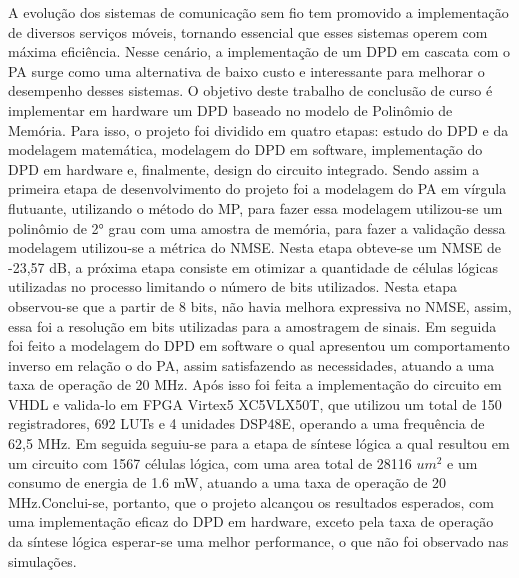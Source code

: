 A evolução dos sistemas de comunicação sem fio tem promovido a implementação de diversos serviços móveis, tornando essencial que esses sistemas operem com máxima eficiência. Nesse cenário, a implementação de um DPD em cascata com o PA surge como uma alternativa de baixo custo e interessante para melhorar o desempenho desses sistemas.
O objetivo deste trabalho de conclusão de curso é implementar em hardware um DPD baseado no modelo de Polinômio de Memória. Para isso, o projeto foi dividido em quatro etapas: estudo do DPD e da modelagem matemática, modelagem do DPD em software, implementação do DPD em hardware e, finalmente, design do circuito integrado.
Sendo assim a primeira etapa de desenvolvimento do projeto foi a modelagem do PA em vírgula flutuante, utilizando o método do MP, para fazer essa modelagem utilizou-se um polinômio de 2° grau com uma amostra de memória, para fazer a validação dessa modelagem utilizou-se a métrica do NMSE. Nesta etapa obteve-se um NMSE de -23,57 dB, a próxima etapa consiste em otimizar a quantidade de células lógicas utilizadas no processo limitando o número de bits utilizados. Nesta etapa observou-se que a partir de 8 bits, não havia melhora expressiva no NMSE, assim, essa foi a resolução em bits utilizadas para a amostragem de sinais. Em seguida foi feito a modelagem do DPD em software o qual apresentou um comportamento inverso em relação o do PA, assim satisfazendo as necessidades, atuando a uma taxa de operação de 20 MHz.  Após isso foi feita a implementação do circuito em VHDL e valida-lo em FPGA Virtex5 XC5VLX50T, que utilizou um total de 150 registradores, 692 LUTs e 4 unidades DSP48E, operando a uma frequência de 62,5 MHz. Em seguida seguiu-se para a etapa de síntese lógica a qual resultou em um circuito com 1567 células lógica, com uma area total de 28116 $um^2$ e um consumo de energia de 1.6 mW, atuando a uma taxa de operação de 20 MHz.Conclui-se, portanto, que o projeto alcançou os resultados esperados, com uma implementação eficaz do DPD em hardware, exceto pela taxa de operação da síntese lógica esperar-se uma melhor performance, o que não foi observado nas simulações.